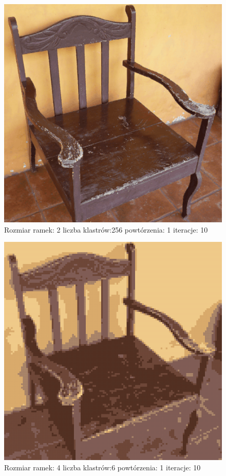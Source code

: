 \documentclass{classrep}
\begin{document}
{{{{                    \begin{figure}[!htbp]
                        \centering
                        \includegraphics[width=\textwidth,width=90mm]{obrazy/chair_R2_K256_P1_It10.png}
                        \caption{Rozmiar ramek: 2 liczba klastrów:256 powtórzenia: 1 iteracje: 10 }
                    \end{figure}

                    \begin{figure}[!htbp]
                        \centering
                        \includegraphics[width=\textwidth,width=90mm]{obrazy/chair_R4_K6_P1_It10.png}
                        \caption{Rozmiar ramek: 4 liczba klastrów:6 powtórzenia: 1 iteracje: 10 }
                    \end{figure}

}}}}
\end{document}

